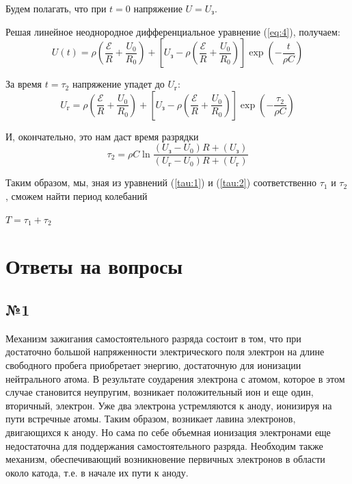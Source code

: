 Будем полагать, что при $t=0$ напряжение $U=U_{\text{з}}$.

Решая линейное неоднородное дифференциальное уравнение (\ref{eq:4}), получаем:
\begin{equation}
	U(t)=\rho \left(\frac{\mathcal{E}}{R}+\frac{U_0}{R_0} \right)+ \left[U_{\text{з}}- \rho\left(\frac{\mathcal{E}}{R}+\frac{U_0}{R_0} \right)\right]\exp{\left( - \frac{t}{\rho C} \right)} 
\end{equation}

За время $t=\tau_2$ напряжение упадет до $U_{\text{г}}$:
\begin{equation}
	U_{\text{г}}=\rho \left(\frac{\mathcal{E}}{R}+\frac{U_0}{R_0} \right)+ \left[U_{\text{з}}- \rho\left(\frac{\mathcal{E}}{R}+\frac{U_0}{R_0} \right)\right]\exp{\left( - \frac{\tau_2}{\rho C} \right)} 
\end{equation}

И, окончательно, это нам даст время разрядки 
\begin{equation}
\label{tau:2}
	\tau_2 =  \rho C \ln { 
	\frac{(U_{\text{з}}  -  U_0) R+ (U_{\text{з}})}
	{(U_{\text{г}}  -  U_0) R+ (U_{\text{г}})}
	}
\end{equation}

Таким образом, мы, зная из уравнений (\ref{tau:1}) и (\ref{tau:2}) соответственно $\tau_1$ и $\tau_2$, сможем найти период колебаний
\begin{center}
$T=\tau_1+\tau_2$
\end{center}
\newpage
\section{Ответы на вопросы}
\subsection{№1}
Механизм зажигания самостоятельного разряда состоит в том, что при достаточно большой напряженности электрического поля электрон на длине свободного пробега приобретает энергию, достаточную для ионизации нейтрального атома. В результате соударения электрона с атомом, которое в этом случае становится неупругим, возникает положительный ион и еще один, вторичный, электрон. Уже два электрона устремляются к аноду, ионизируя на пути встречные атомы. Таким образом, возникает лавина электронов, двигающихся к аноду. Но сама по себе объемная ионизация электронами еще недостаточна для поддержания самостоятельного разряда. Необходим также механизм, обеспечивающий возникновение первичных электронов в области около катода, т.е. в начале их пути к аноду. 

